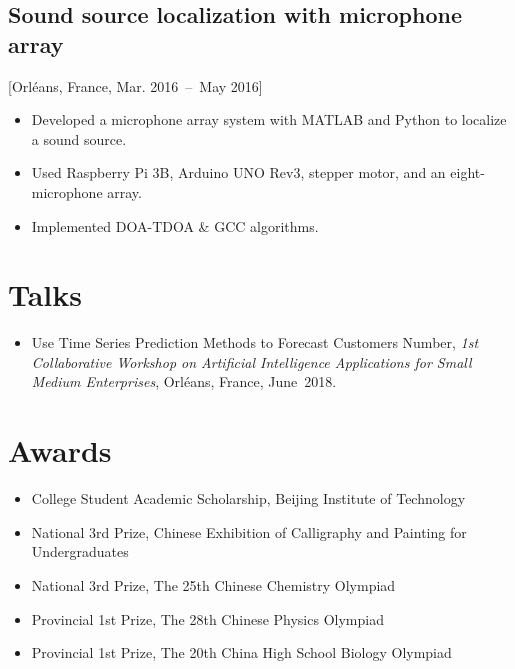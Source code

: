 \documentclass{mycv}
\begin{document}
\subsection{Sound source localization with microphone array}[Orl\'eans, France, Mar. 2016~--~May 2016]

\begin{itemize}
  \itemsep 0em
  \item Developed a microphone array system with MATLAB and Python to localize a sound source.
  \item Used Raspberry Pi 3B, Arduino UNO Rev3, stepper motor, and an eight-microphone array.
  \item Implemented DOA-TDOA \& GCC algorithms. 
\end{itemize}

\section{Talks}

\begin{itemize}
  \itemsep 0em
  \item Use Time Series Prediction Methods to Forecast Customers Number, \emph{1st Collaborative Workshop on Artificial Intelligence Applications for Small Medium Enterprises}, Orl\'eans, France, June~2018.
\end{itemize}

\section{Awards}

\begin{itemize}
  \itemsep 0em
  \item College Student Academic Scholarship, Beijing Institute of Technology 
  \item National 3rd Prize, Chinese Exhibition of Calligraphy and Painting for Undergraduates 
  \item National 3rd Prize, The 25th Chinese Chemistry Olympiad 
  \item Provincial 1st Prize, The 28th Chinese Physics Olympiad 
  \item Provincial 1st Prize, The 20th China High School Biology Olympiad 
\end{itemize}
\end{document}
